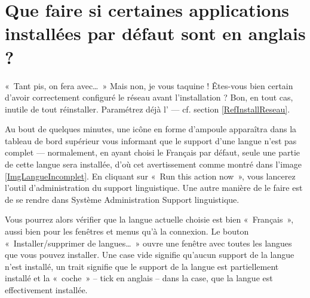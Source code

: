 \section{Que faire si certaines applications installées par défaut sont en anglais ?}
\label{RefSupportLangue}
«~Tant pis, on fera avec\ldots{}~»
Mais non, je vous taquine ! Êtes-vous bien certain d'avoir correctement configuré le réseau avant l'installation ? Bon, en tout cas, inutile de tout réinstaller. Paramétrez déjà l' --- cf. section \ref{RefInstallReseau}.\par
Au bout de quelques minutes, une icône en forme d'ampoule apparaîtra dans la tableau de bord supérieur vous informant que le support d'une langue n'est pas complet --- normalement, en ayant choisi le Français par défaut, seule une partie de cette langue sera installée, d'où cet avertissement comme montré dans l'image \ref{ImgLangueIncomplet}. En cliquant sur «~Run this action now~», vous lancerez l'outil d'administration du support linguistique. Une autre manière de le faire est de se rendre dans Système \FlecheDroite Administration \FlecheDroite Support linguistique.\par
{}
Vous pourrez alors vérifier que la langue actuelle choisie est bien «~Français~», aussi bien pour les fenêtres et menus qu'à la connexion. Le bouton «~Installer/supprimer de langues\ldots{}~» ouvre une fenêtre avec toutes les langues que vous pouvez installer. Une case vide signifie qu'aucun support de la langue n'est installé, un trait signifie que le support de la langue est partiellement installé et la «~coche~» -- tick en anglais -- dans la case, que la langue est effectivement installée.\par
